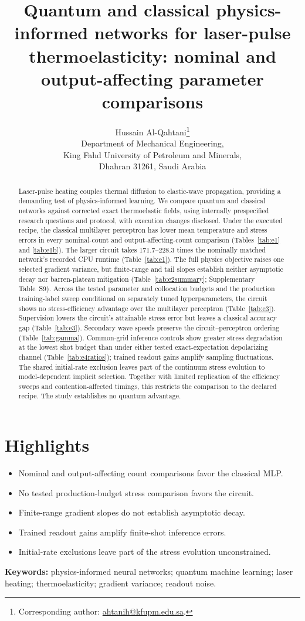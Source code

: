 \documentclass[11pt]{article}
\title{Quantum and classical physics-informed networks for laser-pulse
thermoelasticity: nominal and output-affecting parameter comparisons}
\author{Hussain Al-Qahtani\thanks{Corresponding author:
\href{mailto:ahtanih@kfupm.edu.sa}{ahtanih@kfupm.edu.sa}.}\\
\small Department of Mechanical Engineering,\\
\small King Fahd University of Petroleum and Minerals,\\
\small Dhahran 31261, Saudi Arabia}
\date{}
\begin{document}
\maketitle

\begin{abstract}
Laser-pulse heating couples thermal diffusion to elastic-wave propagation,
providing a demanding test of physics-informed learning. We compare quantum
and classical networks against corrected exact thermoelastic fields, using
internally prespecified research questions and protocol, with execution
changes disclosed. Under the executed recipe, the classical multilayer
perceptron has lower mean temperature and stress errors in every nominal-count
and output-affecting-count comparison (Tables~\ref{tab:e1} and \ref{tab:e1b}).
The larger circuit takes 171.7--228.3 times the nominally matched network's
recorded CPU runtime (Table~\ref{tab:e1}). The full physics objective raises
one selected gradient variance, but finite-range and tail slopes establish
neither asymptotic decay nor barren-plateau mitigation
(Table~\ref{tab:e2summary}; Supplementary Table~S9).
Across the tested parameter and collocation budgets and the production
training-label sweep conditional on separately tuned hyperparameters,
the circuit shows no stress-efficiency advantage over the multilayer perceptron
(Table~\ref{tab:e3}). Supervision lowers the circuit's attainable stress
error but leaves a classical accuracy gap (Table~\ref{tab:e3}).
Secondary wave speeds preserve the circuit--perceptron ordering
(Table~\ref{tab:gamma}). Common-grid inference controls show greater stress
degradation at the lowest shot budget than under either tested
exact-expectation depolarizing channel (Table~\ref{tab:e4ratios}); trained
readout gains amplify sampling fluctuations. The shared initial-rate
exclusion leaves part of the continuum stress evolution to model-dependent
implicit selection. Together with limited replication of the efficiency
sweeps and contention-affected timings, this restricts the comparison to
the declared recipe. The study establishes no quantum advantage.
\end{abstract}

\section*{Highlights}
\begin{itemize}
\item Nominal and output-affecting count comparisons favor the classical MLP.
\item No tested production-budget stress comparison favors the circuit.
\item Finite-range gradient slopes do not establish asymptotic decay.
\item Trained readout gains amplify finite-shot inference errors.
\item Initial-rate exclusions leave part of the stress evolution unconstrained.
\end{itemize}
\noindent\textbf{Keywords:} physics-informed neural networks; quantum machine
learning; laser heating; thermoelasticity; gradient variance; readout noise.
\end{document}
